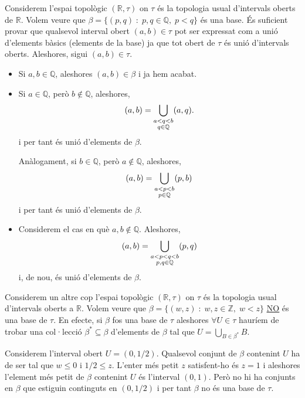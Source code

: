 \documentclass[../main.tex]{subfiles}
\begin{document}
\begin{ej}
\label{ej:base6} Considerem l'espai topològic $(\mathbb{R},\tau)$ on $\tau$ és la topologia usual d'intervals oberts de $\mathbb{R}$. Volem veure que $\beta = \{(p,q)\;:\;p,q\in\mathbb{Q},\;p<q\}$ és una base. És suficient provar que qualsevol interval obert $(a,b)\in\tau$ pot ser expressat com a unió d'elements bàsics (elements de la base) ja que tot obert de $\tau$ és unió d'intervals oberts. Aleshores, sigui $(a,b)\in\tau$.
\begin{itemize}
    \item Si $a,b\in\mathbb{Q}$, aleshores $(a,b)\in\beta$ i ja hem acabat.
    \item Si $a\in\mathbb{Q}$, però $b\not\in\mathbb{Q}$, aleshores,
    \begin{equation}
        \notag
        (a,b) = \bigcup_{\substack{a<q<b\\q\in\mathbb{Q}}} (a,q).
    \end{equation}
    i per tant és unió d'elements de $\beta$.
    
    Anàlogament, si $b\in\mathbb{Q}$, però $a\not\in\mathbb{Q}$, aleshores,
    \begin{equation}
        \notag
        (a,b) = \bigcup_{\substack{a<p<b\\p\in\mathbb{Q}}} (p,b)
    \end{equation}
    i per tant és unió d'elements de $\beta$.
    
    \item Considerem el cas en què $a,b\not\in\mathbb{Q}$. Aleshores,
    \begin{equation}
        \notag
        (a,b) = \bigcup_{\substack{a<p<q<b\\p,q\in\mathbb{Q}}} (p,q)
    \end{equation}
    i, de nou, és unió d'elements de $\beta$.
\end{itemize}
\end{ej}

\begin{ej}
\label{ej:base7} Considerem un altre cop l'espai topològic $(\mathbb{R},\tau)$ on $\tau$ és la topologia usual d'intervals oberts a $\mathbb{R}$. Volem veure que $\beta = \{(w,z)\;:\;w,z\in\mathbb{Z},\;w<z\}$ \underline{\underline{NO}} és una base de $\tau$. En efecte, si $\beta$ fos una base de $\tau$ aleshores $\forall U\in\tau$ hauríem de trobar una col·lecció $\beta^*\subseteq\beta$ d'elements de $\beta$ tal que $U = \bigcup_{B\in\beta^*}B$. 

Considerem l'interval obert $U = (0,1/2)$. Qualsevol conjunt de $\beta$ contenint $U$ ha de ser tal que $w\leq 0$ i $1/2\leq z$. L'enter més petit $z$ satisfent-ho és $z = 1$ i aleshores l'element més petit de $\beta$ contenint $U$ és l'interval $(0,1)$. Però no hi ha conjunts en $\beta$ que estiguin continguts en $(0,1/2)$ i per tant $\beta$ no és una base de $\tau$.
\end{ej}
\end{document}
